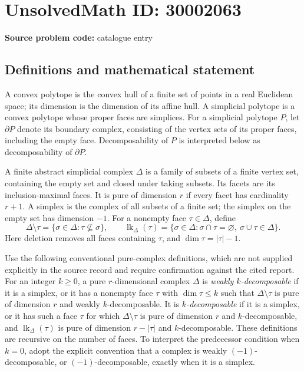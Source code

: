 \documentclass[11pt]{article}
\begin{document}
\section*{UnsolvedMath ID: 30002063}
\textbf{Source problem code:} catalogue entry
\subsection{Definitions and mathematical statement}
A convex polytope is the convex hull of a finite set of points in a real Euclidean space; its dimension is the dimension of its affine hull. A simplicial polytope is a convex polytope whose proper faces are simplices. For a simplicial polytope \(P\), let \(\partial P\) denote its boundary complex, consisting of the vertex sets of its proper faces, including the empty face. Decomposability of \(P\) is interpreted below as decomposability of \(\partial P\).

A finite abstract simplicial complex \(\Delta\) is a family of subsets of a finite vertex set, containing the empty set and closed under taking subsets. Its facets are its inclusion-maximal faces. It is pure of dimension \(r\) if every facet has cardinality \(r+1\). A simplex is the complex of all subsets of a finite set; the simplex on the empty set has dimension \(-1\). For a nonempty face \(\tau\in\Delta\), define
\[
\Delta\setminus\tau=\{\sigma\in\Delta:\tau\nsubseteq\sigma\},\qquad
\operatorname{lk}_{\Delta}(\tau)=\{\sigma\in\Delta:\sigma\cap\tau=\varnothing,\ \sigma\cup\tau\in\Delta\}.
\]
Here deletion removes all faces containing \(\tau\), and \(\dim\tau=|\tau|-1\).

Use the following conventional pure-complex definitions, which are not supplied explicitly in the source record and require confirmation against the cited report. For an integer \(k\ge0\), a pure \(r\)-dimensional complex \(\Delta\) is \emph{weakly \(k\)-decomposable} if it is a simplex, or it has a nonempty face \(\tau\) with \(\dim\tau\le k\) such that \(\Delta\setminus\tau\) is pure of dimension \(r\) and weakly \(k\)-decomposable. It is \emph{\(k\)-decomposable} if it is a simplex, or it has such a face \(\tau\) for which \(\Delta\setminus\tau\) is pure of dimension \(r\) and \(k\)-decomposable, and \(\operatorname{lk}_{\Delta}(\tau)\) is pure of dimension \(r-|\tau|\) and \(k\)-decomposable. These definitions are recursive on the number of faces. To interpret the predecessor condition when \(k=0\), adopt the explicit convention that a complex is weakly \((-1)\)-decomposable, or \((-1)\)-decomposable, exactly when it is a simplex.
\end{document}
